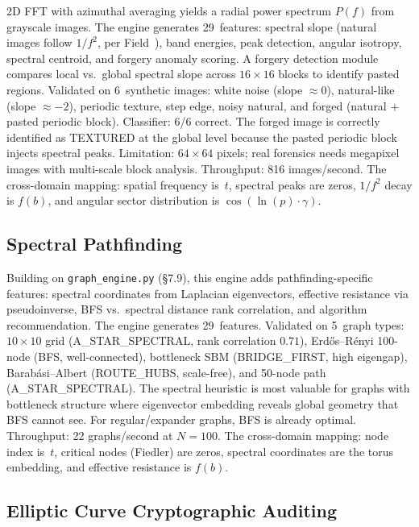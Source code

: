 \documentclass[11pt]{amsart}
\begin{document}
2D FFT with azimuthal averaging yields a radial power spectrum $P(f)$ from
grayscale images. The engine generates 29~features: spectral slope (natural
images follow $1/f^2$, per Field~\cite{Field1987}), band energies, peak detection,
angular isotropy, spectral centroid, and forgery anomaly scoring. A forgery
detection module compares local vs.\ global spectral slope across
$16\times 16$ blocks to identify pasted regions. Validated on 6~synthetic
images: white noise (slope $\approx 0$), natural-like (slope $\approx -2$),
periodic texture, step edge, noisy natural, and forged (natural $+$ pasted
periodic block). Classifier: 6/6 correct. The forged image is correctly
identified as TEXTURED at the global level because the pasted periodic block
injects spectral peaks. Limitation: $64\times 64$ pixels; real forensics
needs megapixel images with multi-scale block analysis. Throughput: 816
images/second. The cross-domain mapping: spatial frequency is~$t$, spectral
peaks are zeros, $1/f^2$ decay is $f(b)$, and angular sector distribution is
$\cos(\ln(p)\cdot\gamma)$.

\subsection{Spectral Pathfinding}

Building on \texttt{graph\_engine.py} (\S7.9), this engine adds
pathfinding-specific features: spectral coordinates from Laplacian
eigenvectors, effective resistance via pseudoinverse, BFS vs.\ spectral
distance rank correlation, and algorithm recommendation. The engine generates
29~features. Validated on 5~graph types: $10\times 10$ grid
(A\_STAR\_SPECTRAL, rank correlation $0.71$), Erd\H{o}s--R\'enyi 100-node
(BFS, well-connected), bottleneck SBM (BRIDGE\_FIRST, high eigengap),
Barab\'asi--Albert (ROUTE\_HUBS, scale-free), and 50-node path
(A\_STAR\_SPECTRAL). The spectral heuristic is most valuable for graphs with
bottleneck structure where eigenvector embedding reveals global geometry that
BFS cannot see. For regular/expander graphs, BFS is already optimal.
Throughput: 22 graphs/second at $N=100$. The cross-domain mapping: node
index is~$t$, critical nodes (Fiedler) are zeros, spectral coordinates are
the torus embedding, and effective resistance is $f(b)$.

\subsection{Elliptic Curve Cryptographic Auditing}
\end{document}
